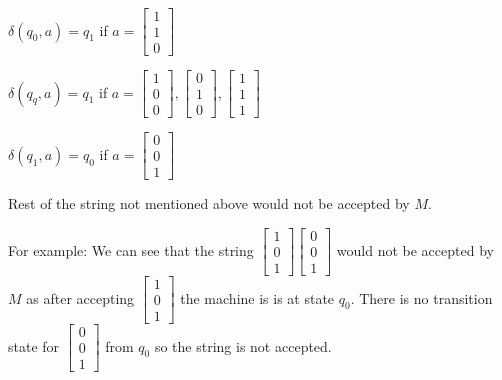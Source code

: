 \begin{solution}
\begin{enumerate}
    $\delta(q_{0}, a) = q_{1}$ if $a = \begin{bmatrix}
      1\\
      1\\
      0
    \end{bmatrix}$

    $\delta(q_{q}, a) = q_{1}$ if $a = \begin{bmatrix}
      1\\
      0\\
      0
    \end{bmatrix},
    \begin{bmatrix}
      0\\
      1\\
      0
    \end{bmatrix},
    \begin{bmatrix}
      1\\
      1\\
      1
    \end{bmatrix}$

    $\delta(q_{1}, a) = q_{0}$ if $a = \begin{bmatrix}
      0\\
      0\\
      1
    \end{bmatrix}$
  \end{enumerate}

  Rest of the string not mentioned above would not be accepted by $M$.

  For example: We can see that the string $\begin{bmatrix}
    1\\
    0\\
    1
  \end{bmatrix} \begin{bmatrix}
    0\\
    0\\
    1
    \end{bmatrix}$ would not be accepted by $M$ as after accepting $\begin{bmatrix}1\\0\\1\end{bmatrix}$ the machine is is at state $q_{0}$. There is no transition state for $\begin{bmatrix}0\\0\\1\end{bmatrix}$ from $q_{0}$ so the string is not accepted.

\end{solution}




